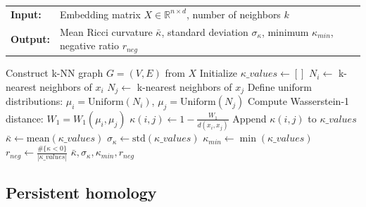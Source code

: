 \documentclass[]{Liebert_Author_revised}
\begin{document}
\begin{algorithm}[h!]
\caption{Compute Ollivier-Ricci Curvature}
\label{alg_Ricci}
\small
\noindent
\begin{tabular}{p{1cm}p{7cm}}
\textbf{Input:}  & Embedding matrix $X \in \mathbb{R}^{n \times d}$, number of neighbors $k$ \\
\textbf{Output:} & Mean Ricci curvature $\bar{\kappa}$, standard deviation $\sigma_\kappa$, 
        minimum $\kappa_{min}$, negative ratio $r_{neg}$
\end{tabular}
\begin{algorithmic}[1]
\STATE Construct k-NN graph $G = (V, E)$ from $X$
\STATE Initialize $\kappa\_values \leftarrow []$
    \STATE $N_i \leftarrow$ k-nearest neighbors of $x_i$
    \STATE $N_j \leftarrow$ k-nearest neighbors of $x_j$
    \STATE Define uniform distributions: $\mu_i = \text{Uniform}(N_i)$, 
           $\mu_j = \text{Uniform}(N_j)$
    \STATE Compute Wasserstein-1 distance: $W_1 = W_1(\mu_i, \mu_j)$
    \STATE $\kappa(i,j) \leftarrow 1 - \frac{W_1}{d(x_i, x_j)}$
    \STATE Append $\kappa(i,j)$ to $\kappa\_values$
\ENDFOR
\STATE $\bar{\kappa} \leftarrow \text{mean}(\kappa\_values)$
\STATE $\sigma_\kappa \leftarrow \text{std}(\kappa\_values)$
\STATE $\kappa_{min} \leftarrow \min(\kappa\_values)$
\STATE $r_{neg} \leftarrow \frac{\#\{\kappa < 0\}}{|\kappa\_values|}$
\RETURN $\bar{\kappa}, \sigma_\kappa, \kappa_{min}, r_{neg}$
\end{algorithmic}
\end{algorithm}


\subsection{Persistent homology}
\end{document}
